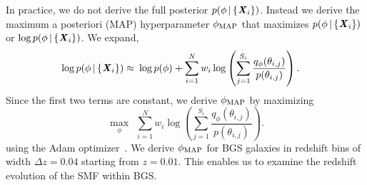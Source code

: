 In practice, we do not derive the full posterior 
$p(\phi \,|\, \{{\textbf{\textit{X}}_i}\})$. 
Instead we derive the maximum a posteriori (MAP) hyperparameter 
$\phi_{\rm MAP}$ that maximizes $p(\phi \,|\, \{{\textbf{\textit{X}}_i}\})$ or 
$\log p(\phi \,|\, \{{\textbf{\textit{X}}_i}\})$.
We expand, 
\begin{align}
\log p(\phi \given \{{\bfi X_i}\}) 
    \approx&~\log p(\phi) + %
    \sum\limits_{i=1}^N w_i \log \left(\sum\limits_{j=1}^{S_i} \frac{q_\phi(\theta_{i,j})}{p(\theta_{i,j})} \right).
\end{align} 
Since the first two terms are constant, we derive $\phi_{\rm MAP}$ by
maximizing 
\begin{equation}
    \max_\phi~~\sum\limits_{i=1}^N w_i \log \left(\sum\limits_{j=1}^{S_i} \frac{q_\phi(\theta_{i,j})}{p(\theta_{i,j})} \right).
\end{equation}
using the {\sc Adam} optimizer~\citep{kingma2017}.  
We derive $\phi_{\rm MAP}$ for BGS galaxies in redshift bins of width 
$\Delta z = 0.04$ starting from $z =0.01$. 
This enables us to examine the redshift evolution of the SMF within BGS. 



